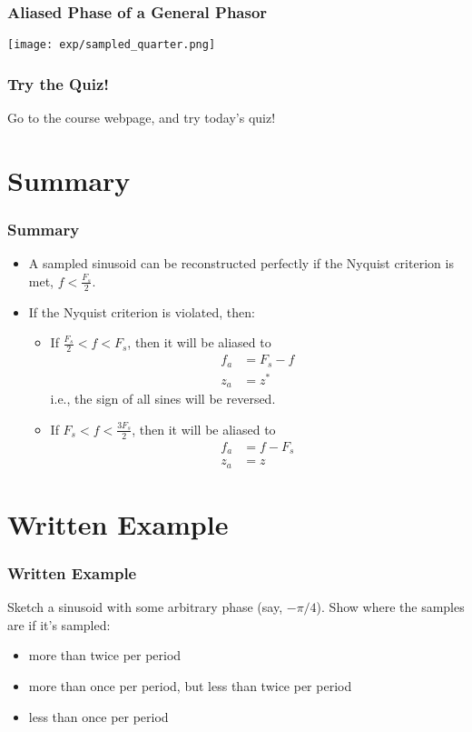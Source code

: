 \documentclass{beamer}
\begin{document}
\begin{frame}
  \frametitle{Aliased Phase of a  General Phasor}
  \centerline{\texttt{[image: exp/sampled\_quarter.png]}}
\end{frame}

\begin{frame}
  \frametitle{Try the Quiz!}
  Go to the course webpage, and try today's quiz!
\end{frame}

\section[Summary]{Summary}
\setcounter{subsection}{1}

\begin{frame}
  \frametitle{Summary}

  \begin{itemize}
  \item A sampled sinusoid can be reconstructed perfectly if the
    Nyquist criterion is met, $f < \frac{F_s}{2}$.
  \item If the Nyquist criterion is violated, then:
    \begin{itemize}
    \item If $\frac{F_s}{2}<f<F_s$, then it will be aliased to
      \begin{align*}
        f_a &= F_s-f\\
        z_a &= z^*
      \end{align*}
      i.e., the sign of all sines will be reversed.
    \item If $F_s < f < \frac{3F_s}{2}$, then it will be aliased to
      \begin{align*}
        f_a &= f-F_s\\
        z_a &= z
      \end{align*}
    \end{itemize}
  \end{itemize}
\end{frame}

\section[Example]{Written Example}
\setcounter{subsection}{1}

\begin{frame}
  \frametitle{Written Example}

  Sketch a sinusoid with some arbitrary phase (say, $-\pi/4$).  Show
  where the samples are if it's sampled:
  \begin{itemize}
  \item more than twice per period
  \item more than once per period, but less than twice per period
  \item less than once per period
  \end{itemize}
\end{frame}
  
\end{document}
